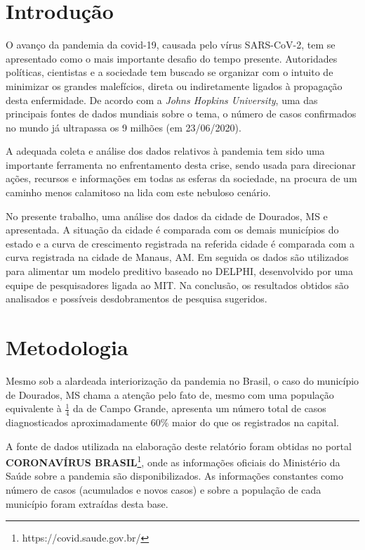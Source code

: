 \documentclass[12pt]{article}
\begin{document}
\section{Introdução}

O avanço da pandemia da covid-19, causada pelo vírus SARS-CoV-2, tem se apresentado como o mais importante desafio do tempo presente. Autoridades políticas, cientistas e a sociedade tem buscado se organizar com o intuito de minimizar os grandes malefícios, direta ou indiretamente ligados à propagação desta enfermidade. De acordo com a \textit{Johns Hopkins University}, uma das principais fontes de dados mundiais sobre o tema, o número de casos confirmados no mundo já ultrapassa os 9 milhões (em 23/06/2020).

A adequada coleta e análise dos dados relativos à pandemia tem sido uma importante ferramenta no enfrentamento desta crise, sendo usada para direcionar ações, recursos e informações em todas as esferas da sociedade, na procura de um caminho menos calamitoso na lida com este nebuloso cenário.

No presente trabalho, uma análise dos dados da cidade de Dourados, MS e apresentada. A situação da cidade é comparada com os demais municípios do estado e a curva de crescimento registrada na referida cidade é comparada com a curva registrada na cidade de Manaus, AM. Em seguida os dados são utilizados para alimentar um modelo preditivo baseado no DELPHI, desenvolvido por uma equipe de pesquisadores ligada ao MIT. Na conclusão, os resultados obtidos são analisados e possíveis desdobramentos de pesquisa sugeridos. 

\section{Metodologia}\label{sec:met}

Mesmo sob a alardeada interiorização da pandemia no Brasil, o caso do município de Dourados, MS chama a atenção pelo fato de, mesmo com uma população equivalente à \(\frac{1}{4}\) da de Campo Grande, apresenta um número total de casos diagnosticados aproximadamente 60\% maior do que os registrados na capital.

A fonte de dados utilizada na elaboração deste relatório foram obtidas no portal \textbf{CORONAVÍRUS BRASIL}\footnote{https://covid.saude.gov.br/}, onde as informações oficiais do Ministério da Saúde sobre a pandemia são disponibilizados. As informações constantes como número de casos (acumulados e novos casos) e sobre a população de cada município foram extraídas desta base.
\end{document}
